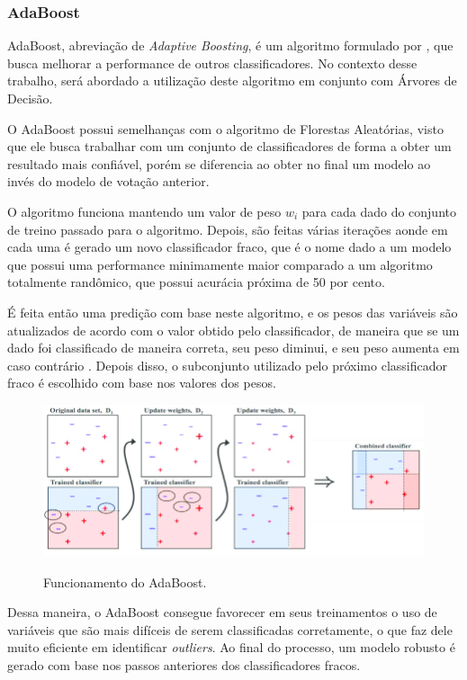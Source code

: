 \subsubsection{AdaBoost}

AdaBoost, abreviação de \textit{Adaptive Boosting}, é um algoritmo formulado por \cite{FREUND1997119}, que busca melhorar a performance de outros classificadores. No contexto desse trabalho, será abordado a utilização deste algoritmo em conjunto com Árvores de Decisão.

O AdaBoost possui semelhanças com o algoritmo de Florestas Aleatórias, visto que ele busca trabalhar com um conjunto de classificadores de forma a obter um resultado mais confiável, porém se diferencia ao obter no final um modelo ao invés do modelo de votação anterior.

O algoritmo funciona mantendo um valor de peso $w_{i}$ para cada dado do conjunto de treino passado para o algoritmo. Depois, são feitas várias iterações aonde em cada uma é gerado um novo classificador fraco, que é o nome dado a um modelo que possui uma performance minimamente maior comparado a um algoritmo totalmente randômico, que possui acurácia próxima de 50 por cento.

É feita então uma predição com base neste algoritmo, e os pesos das variáveis são atualizados de acordo com o valor obtido pelo classificador, de maneira que se um dado foi classificado de maneira correta, seu peso diminui, e seu peso aumenta em caso contrário \cite{rojas2009adaboost}. Depois disso, o subconjunto utilizado pelo próximo classificador fraco é escolhido com base nos valores dos pesos.

\begin{figure}[h]
\caption{\small Funcionamento do AdaBoost.}
\centering
\includegraphics[scale=1.4]{figs/adaboost.png}
\label{f.adaboost}
\end{figure}

Dessa maneira, o AdaBoost consegue favorecer em seus treinamentos o uso de variáveis que são mais difíceis de serem classificadas corretamente, o que faz dele muito eficiente em identificar \textit{outliers}. Ao final do processo, um modelo robusto é gerado com base nos passos anteriores dos classificadores fracos.

